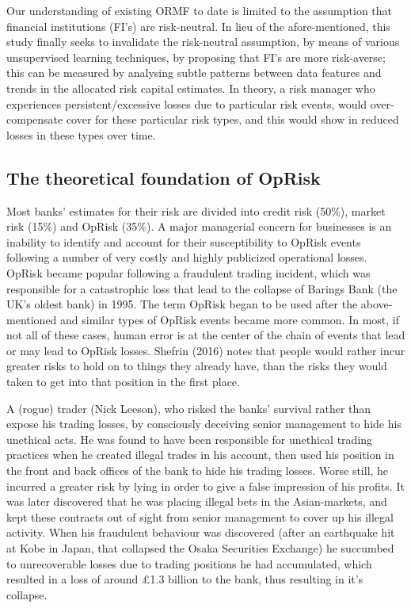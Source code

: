 \documentclass[]{DissertateUSU}
\begin{document}
Our understanding of existing ORMF to date is limited to the assumption
that financial institutions (FI's) are risk-neutral. In lieu of the
afore-mentioned, this study finally seeks to invalidate the risk-neutral
assumption, by means of various unsupervised learning techniques, by
proposing that FI's are more risk-averse; this can be measured by
analysing subtle patterns between data features and trends in the
allocated risk capital estimates. In theory, a risk manager who
experiences persistent/excessive losses due to particular risk events,
would over-compensate cover for these particular risk types, and this
would show in reduced losses in these types over time.\medskip 

\subsection{The theoretical foundation of OpRisk}

Most banks' estimates for their risk are divided into credit risk
(50\%), market risk (15\%) and OpRisk (35\%). A major managerial concern
for businesses is an inability to identify and account for their
susceptibility to OpRisk events following a number of very costly and
highly publicized operational losses. OpRisk became popular following a
fraudulent trading incident, which was responsible for a catastrophic
loss that lead to the collapse of Barings Bank (the UK's oldest bank) in
1995. The term OpRisk began to be used after the above-mentioned and
similar types of OpRisk events became more common. In most, if not all
of these cases, human error is at the center of the chain of events that
lead or may lead to OpRisk losses. Shefrin (2016) notes that people
would rather incur greater risks to hold on to things they already have,
than the risks they would taken to get into that position in the first
place.\medskip

A (rogue) trader (Nick Leeson), who risked the banks' survival rather
than expose his trading losses, by consciously deceiving senior
management to hide his unethical acts. He was found to have been
responsible for unethical trading practices when he created illegal
trades in his account, then used his position in the front and back
offices of the bank to hide his trading losses. Worse still, he incurred
a greater risk by lying in order to give a false impression of his
profits. It was later discovered that he was placing illegal bets in the
Asian-markets, and kept these contracts out of sight from senior
management to cover up his illegal activity. When his fraudulent
behaviour was discovered (after an earthquake hit at Kobe in Japan, that
collapsed the Osaka Securities Exchange) he succumbed to unrecoverable
losses due to trading positions he had accumulated, which resulted in a
loss of around \pounds 1.3 billion to the bank, thus resulting in it's
collapse.\medskip
\end{document}

